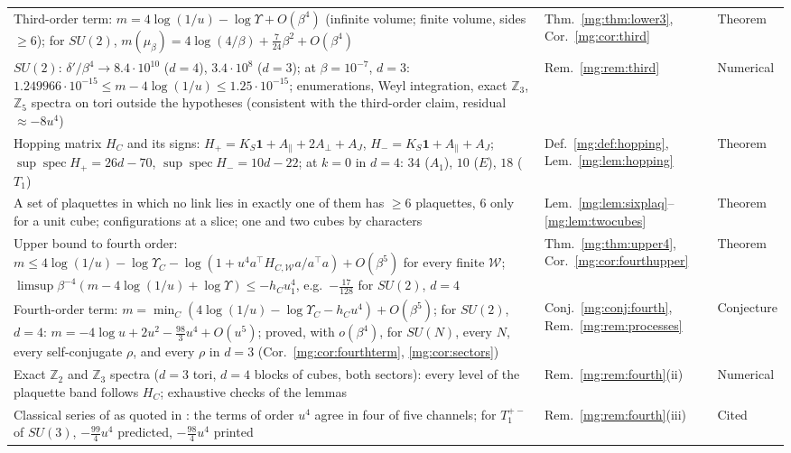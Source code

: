 \documentclass[11pt,a4paper]{article}
\theoremstyle{definition}
\theoremstyle{remark}
\DeclareMathOperator{\spec}{spec}
\begin{document}
\begin{longtable}{@{}p{}p{}p{}@{}}
Third-order term: $m=4\log(1/u)-\log\Upsilon+O(\beta^4)$ (infinite volume; finite volume, sides $\ge6$); for $SU(2)$, $m(\mu_\beta)=4\log(4/\beta)+\frac7{24}\beta^2+O(\beta^4)$ & Thm.~\ref{mg:thm:lower3}, Cor.~\ref{mg:cor:third} & Theorem\\
$SU(2)$: $\delta'/\beta^4\to8.4\cdot10^{10}$ ($d=4$), $3.4\cdot10^8$ ($d=3$); at $\beta=10^{-7}$, $d=3$: $1.249966\cdot10^{-15}\le m-4\log(1/u)\le1.25\cdot10^{-15}$; enumerations, Weyl integration, exact $\mathbb Z_3$, $\mathbb Z_5$ spectra on tori outside the hypotheses (consistent with the third-order claim, residual $\approx-8u^4$) & Rem.~\ref{mg:rem:third} & Numerical\\
Hopping matrix $H_C$ and its signs: $H_+=K_S\mathbf 1+A_\parallel+2A_\perp+A_J$, $H_-=K_S\mathbf 1+A_\parallel+A_J$; $\sup\spec H_+=26d-70$, $\sup\spec H_-=10d-22$; at $k=0$ in $d=4$: $34$ ($A_1$), $10$ ($E$), $18$ ($T_1$) & Def.~\ref{mg:def:hopping}, Lem.~\ref{mg:lem:hopping} & Theorem\\
A set of plaquettes in which no link lies in exactly one of them has $\ge6$ plaquettes, $6$ only for a unit cube; configurations at a slice; one and two cubes by characters & Lem.~\ref{mg:lem:sixplaq}--\ref{mg:lem:twocubes} & Theorem\\
Upper bound to fourth order: $m\le4\log(1/u)-\log\Upsilon_C-\log(1+u^4a^\top H_{C,\mathcal W}a/a^\top a)+O(\beta^5)$ for every finite $\mathcal W$; $\limsup\beta^{-4}(m-4\log(1/u)+\log\Upsilon)\le-h_Cu_1^4$, e.g.\ $-\frac{17}{128}$ for $SU(2)$, $d=4$ & Thm.~\ref{mg:thm:upper4}, Cor.~\ref{mg:cor:fourthupper} & Theorem\\
Fourth-order term: $m=\min_C(4\log(1/u)-\log\Upsilon_C-h_Cu^4)+O(\beta^5)$; for $SU(2)$, $d=4$: $m=-4\log u+2u^2-\frac{98}3u^4+O(u^5)$; proved, with $o(\beta^4)$, for $SU(N)$, every $N$, every self-conjugate $\rho$, and every $\rho$ in $d=3$ (Cor.~\ref{mg:cor:fourthterm}, \ref{mg:cor:sectors}) & Conj.~\ref{mg:conj:fourth}, Rem.~\ref{mg:rem:processes} & Conjecture\\
Exact $\mathbb Z_2$ and $\mathbb Z_3$ spectra ($d=3$ tori, $d=4$ blocks of cubes, both sectors): every level of the plaquette band follows $H_C$; exhaustive checks of the lemmas & Rem.~\ref{mg:rem:fourth}(ii) & Numerical\\
Classical series of \cite{Mun81,Seo82} as quoted in \cite{LMP07}: the terms of order $u^4$ agree in four of five channels; for $T_1^{+-}$ of $SU(3)$, $-\frac{99}4u^4$ predicted, $-\frac{98}4u^4$ printed & Rem.~\ref{mg:rem:fourth}(iii) & Cited\\

\end{longtable}
\end{document}
